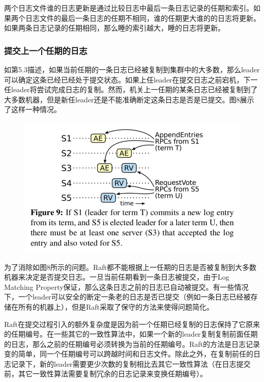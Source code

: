 \documentclass[journal]{IEEEtran}
\begin{document}
两个日志文件谁的日志更新是通过比较日志中最后一条日志记录的任期和索引。如果两个日志文件的最后一条日志的任期不相同，谁的任期更大谁的的日志将更新。如果两条日志记录的任期相同，那么睡的索引越大，睡的日志将更新。

\subsubsection{提交上一个任期的日志}

如第5.3描述，如果当前任期的一条日志已经被复制到集群中的大多数，那么leader可以确定这条已经已经处于提交状态。如果上任leader在提交日志之前宕机，下一任leader将尝试完成日志的复制。然而，机关上一任期的某条日志已经被复制到了大多数机器，但是新任leader还是不能准确断定这条日志是否是已提交。图8展示了这样一种情况。
\begin{figure}[htbp]
\begin{center}
\includegraphics[width=1\linewidth]{./fig9.png}
\end{center}
\end{figure}

为了消除如图8所示的问题。Raft都不能根据上一任期的日志是否被复制到大多数机器来决定是否提交日志。一旦当前任期看到一条日志被提交，由于Log Matching Property保证，那么这条日志之前的日志已自动被提交。有一些情况下，一个leader可以安全的断定一条老的日志是否已提交（例如一条日志已经被存储在所有的机器上），但是Raft采取了保守的方法来使得问题简化。

Raft在提交过程引入的额外复杂度是因为前一个任期已经复制的日志保持了它原来的任期编号。在一些其它的一致性算法中，如果一个新的leader复制复制前面任期的日志，那么之前的任期编号必须转换为当前的任期编号。Raft的方法是日志记录变的简单，同一个任期编号可以跨越时间和日志文件。除此之外，在复制前任的日志记录下，新的leader需要更少次数的复制相比去其它一致性算法（在日志提交前，其它一致性算法需要复制冗余的日志记录来变换任期编号）。
\end{document}
